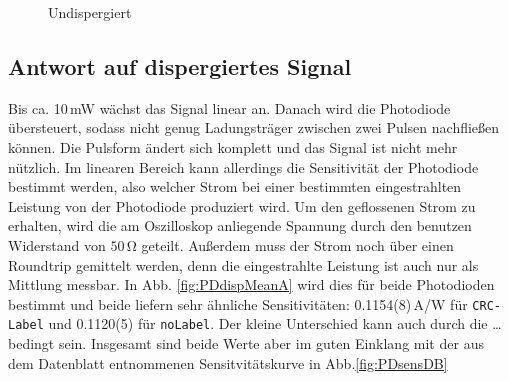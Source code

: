\documentclass[bachelor,       %
               twoside,        %
               BCOR10mm,       %
               english,ngerman, %
               ]{GAUBM}
\begin{document}
\begin{figure}[!htb]
	\centering
   \hfill
	\caption{Undispergiert}
	\label{fig:PDundisp}
\end{figure}


\subsection{Antwort auf dispergiertes Signal}
Bis ca. 10\,mW wächst das Signal linear an.
Danach wird die Photodiode übersteuert, sodass nicht genug Ladungsträger zwischen zwei Pulsen nachfließen können.
Die Pulsform ändert sich komplett und das Signal ist nicht mehr nützlich.
Im linearen Bereich kann allerdings die Sensitivität der Photodiode bestimmt werden, also welcher Strom bei einer bestimmten eingestrahlten Leistung von der Photodiode produziert wird.
Um den geflossenen Strom zu erhalten, wird die am Oszilloskop anliegende Spannung durch den benutzen Widerstand von $50\,\si\ohm$ geteilt.
Außerdem muss der Strom noch über einen Roundtrip gemittelt werden, denn die eingestrahlte Leistung ist auch nur als Mittlung messbar.
In Abb. \ref{fig:PDdispMeanA} wird dies für beide Photodioden bestimmt und beide liefern sehr ähnliche Sensitivitäten: 0.1154(8)\,A/W für  \texttt{CRC-Label} und  0.1120(5) für \texttt{noLabel}.
Der kleine Unterschied kann auch durch die \dots bedingt sein.
Insgesamt sind beide Werte aber im guten Einklang mit der aus dem Datenblatt entnommenen Sensitvitätskurve in Abb.\ref{fig:PDsensDB}
\end{document}
